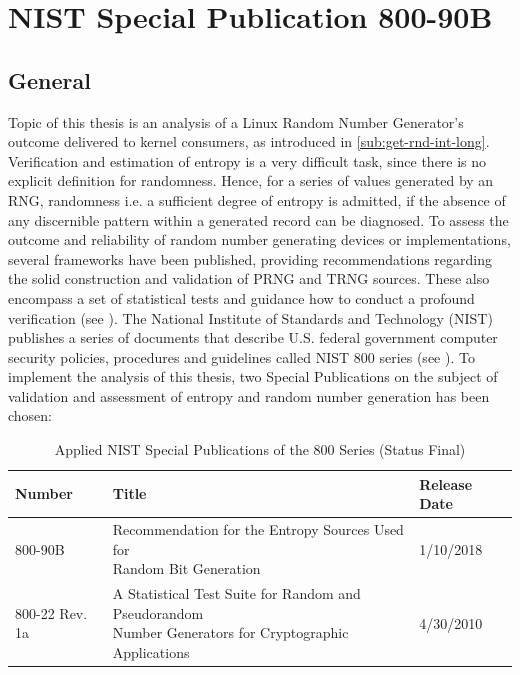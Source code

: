 \chapter{NIST Special Publication 800-90B}
\label{chap:NIST800-90B}
\section{General}

Topic of this thesis is an analysis of a Linux Random Number Generator's outcome delivered to kernel consumers, as introduced in \ref{sub:get-rnd-int-long}. Verification and estimation of entropy is 
a very difficult task, since there is no explicit definition for randomness. Hence, for a series of values generated by an RNG, randomness i.e. a sufficient degree of entropy is admitted, if the absence of any discernible pattern within a generated record can be diagnosed.
To assess the outcome and reliability of random number generating devices or implementations, several frameworks have been published, providing recommendations regarding the solid construction and validation of PRNG and TRNG sources. These also encompass a set of statistical tests and guidance how to conduct a profound verification (see \cite{robert2006dieharder, rukhin2010nist, turan2018nist}).
The National Institute of Standards and Technology (NIST) publishes a series of documents that describe U.S. federal government computer security policies, procedures and guidelines called NIST 800 series (see \cite[]{nist800pub}). To implement the analysis of this thesis, two Special Publications on the subject of validation and assessment of entropy and random number generation has been chosen:

\begin{table}[H]
	\centering
	\label{tab:nist800sps}
	\begin{tabular}{lll}\\ \hline 
		Number & Title & Release Date \\ \hline \hline 
		800-90B & \makecell[l]{Recommendation for the Entropy Sources Used for\\Random Bit Generation} & 1/10/2018 \\ \hline 
		800-22 Rev. 1a & \makecell[l]{A Statistical Test Suite for Random and Pseudorandom\\Number Generators for Cryptographic Applications} & 4/30/2010 \\ \hline 
	\end{tabular}
	\caption{Applied NIST Special Publications of the 800 Series (Status Final)}
\end{table} 


